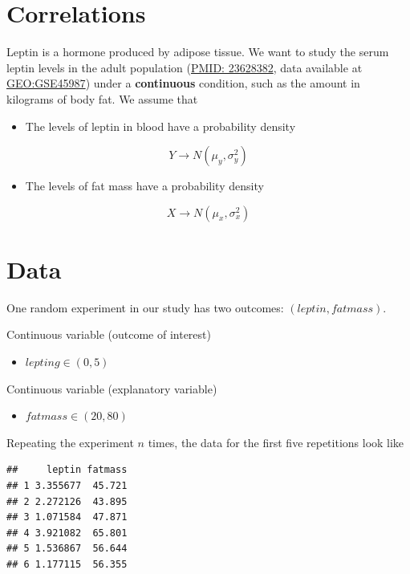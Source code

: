 \documentclass[
]{book}
\providecommand{\tightlist}{%
  \setlength{\itemsep}{0pt}\setlength{\parskip}{0pt}}
\begin{document}
\hypertarget{correlations}{%
\section{Correlations}\label{correlations}}

Leptin is a hormone produced by adipose tissue. We want to study the serum leptin levels in the adult population (\href{https://pubmed.ncbi.nlm.nih.gov/23628382/}{PMID: 23628382}, data available at \href{https://www.ncbi.nlm.nih.gov/geo/query/acc.cgi?acc=GSE45987}{GEO:GSE45987}) under a \textbf{continuous} condition, such as the amount in kilograms of body fat. We assume that

\begin{itemize}
\tightlist
\item
  The levels of leptin in blood have a probability density
\end{itemize}

\[Y \rightarrow N(\mu_y, \sigma_y^2)\]

\begin{itemize}
\tightlist
\item
  The levels of fat mass have a probability density
\end{itemize}

\[X \rightarrow N(\mu_x, \sigma_x^2)\]

\hypertarget{data-5}{%
\section{Data}\label{data-5}}

One random experiment in our study has two outcomes: \((leptin, fatmass)\).

Continuous variable (outcome of interest)

\begin{itemize}
\tightlist
\item
  \(lepting \in (0, 5)\)
\end{itemize}

Continuous variable (explanatory variable)

\begin{itemize}
\tightlist
\item
  \(fatmass \in (20,80)\)
\end{itemize}

Repeating the experiment \(n\) times, the data for the first five repetitions look like

\begin{verbatim}
##     leptin fatmass
## 1 3.355677  45.721
## 2 2.272126  43.895
## 3 1.071584  47.871
## 4 3.921082  65.801
## 5 1.536867  56.644
## 6 1.177115  56.355
\end{verbatim}
\end{document}
